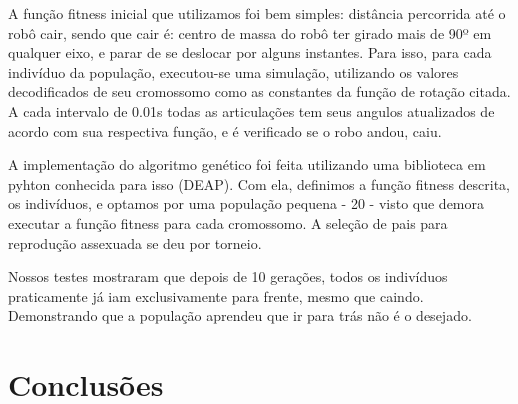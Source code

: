 \documentclass[twoside,conference,a4paper]{IEEEtran}
\begin{document}
A função fitness inicial que utilizamos foi bem simples: distância percorrida até o robô cair, sendo que cair é: centro de massa do robô ter girado mais de 90º em qualquer eixo, e parar de se deslocar por alguns instantes. Para isso, para cada indivíduo da população, executou-se uma simulação, utilizando os valores decodificados de seu cromossomo como as constantes da função de rotação citada. A cada intervalo de 0.01s todas as articulações tem seus angulos atualizados de acordo com sua respectiva função, e é verificado se o robo andou, caiu.

A implementação do algoritmo genético foi feita utilizando uma biblioteca em pyhton conhecida para isso (DEAP). Com ela, definimos a função fitness descrita, os indivíduos, e optamos por uma população pequena - 20 - visto que demora executar a função fitness para cada cromossomo. A seleção de pais para reprodução assexuada se deu por torneio.

Nossos testes mostraram que depois de 10 gerações, todos os indivíduos praticamente já iam exclusivamente para frente, mesmo que caindo. Demonstrando que a população aprendeu que ir para trás não é o desejado.

\section{Conclusões} \label{conclusoes}

\nocite{Aula}



\end{document}
